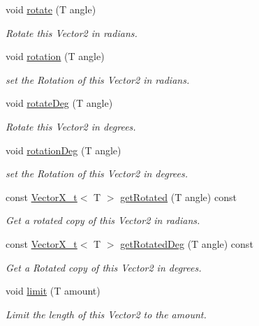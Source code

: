 \begin{DoxyCompactItemize}
void \hyperlink{class_vector_x__t_ad4e572fc98fe4d786b907598b2c8eb77}{rotate} (T angle)
\begin{DoxyCompactList}\small\item\em Rotate this Vector2 in radians. \end{DoxyCompactList}\item 
void \hyperlink{class_vector_x__t_a3ff22c065f96081f36844f175822117b}{rotation} (T angle)
\begin{DoxyCompactList}\small\item\em set the Rotation of this Vector2 in radians. \end{DoxyCompactList}\item 
void \hyperlink{class_vector_x__t_a06dd763262cfd0779011a0a292ba2143}{rotate\+Deg} (T angle)
\begin{DoxyCompactList}\small\item\em Rotate this Vector2 in degrees. \end{DoxyCompactList}\item 
void \hyperlink{class_vector_x__t_a9f02a5c0c808aa2270e443031ba1e9e0}{rotation\+Deg} (T angle)
\begin{DoxyCompactList}\small\item\em set the Rotation of this Vector2 in degrees. \end{DoxyCompactList}\item 
const \hyperlink{class_vector_x__t}{Vector\+X\+\_\+t}$<$ T $>$ \hyperlink{class_vector_x__t_a73fc65bea5601dc510b720305fab02b5}{get\+Rotated} (T angle) const
\begin{DoxyCompactList}\small\item\em Get a rotated copy of this Vector2 in radians. \end{DoxyCompactList}\item 
const \hyperlink{class_vector_x__t}{Vector\+X\+\_\+t}$<$ T $>$ \hyperlink{class_vector_x__t_ae1d1ebad5cbaa4430f9a6e230b98c99e}{get\+Rotated\+Deg} (T angle) const
\begin{DoxyCompactList}\small\item\em Get a Rotated copy of this Vector2 in degrees. \end{DoxyCompactList}\item 
void \hyperlink{class_vector_x__t_a2a4914eef4789c14c1c78b235b298565}{limit} (T amount)
\begin{DoxyCompactList}\small\item\em Limit the length of this Vector2 to the amount. \end{DoxyCompactList}\item 

\end{DoxyCompactItemize}
